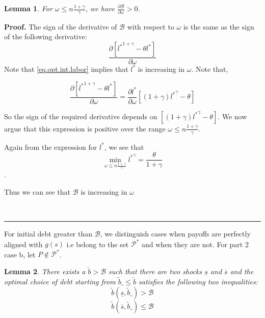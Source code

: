 \documentclass[thmsb,11pt]{article}
\newtheorem{lemma}{Lemma}
\newenvironment{proof}[1][Proof]{\noindent \textbf{#1.} }{\  \rule{0.5em}{0.5em}}
\begin{document}
\begin{lemma}
\label{lem comparative statics of B with omega}
For $\omega\leq n \frac{1+\gamma}{\gamma} $, we have $\frac{\partial \mathcal{B}}{\partial \omega}>0$.
\end{lemma}
\begin{proof}
The sign of the derivative of $\mathcal{B}$ with respect to $\omega$ is the same as the sign of the following derivative:
\[\frac{\partial \left[{l^*}^{1+\gamma}-\theta l^*\right]}{\partial \omega}\]
Note that \eqref{eq.opt.int.labor} implies that $l^*$  is increasing in $\omega$. Note that,

\[\frac{\partial \left[{l^*}^{1+\gamma}-\theta l^*\right]}{\partial \omega}=\frac{\partial l^*}{\partial \omega}\left [ (1+\gamma){l^*}^{\gamma}-\theta\right]\]

So the sign of the required derivative depends on $\left [ (1+\gamma){l^*}^{\gamma}-\theta\right]$. We now argue that this expression is positive over the range $\omega\leq n \frac{1+\gamma}{\gamma}$.


Again from the expression for $l^*$, we see that
\[\min_{\omega \leq n\frac{1+\gamma}{\gamma}}{l^*}^{\gamma}=\frac{\theta}{1+\gamma}\].

Thus we can see that $\mathcal{B}$ is increasing in $\omega$

\end{proof}

For initial debt greater than $\mathcal{B}$, we distinguish cases when payoffs are perfectly aligned with $g(s)$ i.e belong to the set $\mathcal{P}^*$ and when they are not. For part 2 case b, let $P\not \in \mathcal{P}^*$.

\begin{lemma}
\label{lem.limit.in.one.step}
There exists a $\check b>\mathcal{B}$ such that there are two shocks $\underline{s}$ and $\overline{s}$ and the optimal choice of debt starting from $\tilde{b}\_\leq \check b$ satisfies the following two inequalities:
\[\tilde{b}(\underline s,\tilde{b}\_)>\mathcal{B}\]
\[\tilde{b}(\overline s,\tilde{b}\_)\leq \mathcal{B}\]
\end{lemma}
\end{document}
